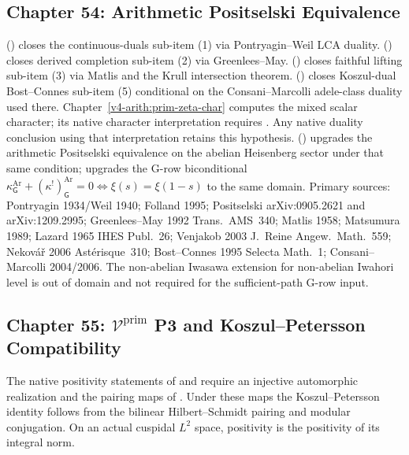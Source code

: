 \subsection{Chapter 54: Arithmetic Positselski Equivalence}
\label{v4-arith:w5-synth:ch54}

 (\ClaimStatusProvedHere)
closes the continuous-duals sub-item (1) via Pontryagin--Weil LCA
duality.
 (\ClaimStatusProvedHere)
closes derived completion sub-item (2) via Greenlees--May.
 (\ClaimStatusProvedHere)
closes faithful lifting sub-item (3) via Matlis and the Krull
intersection theorem.
(\ClaimStatusProvedHereConditional) closes Koszul-dual
Bost--Connes sub-item (5) conditional on the Consani--Marcolli
adele-class duality used there.
Chapter~\ref{v4-arith:prim-zeta-char} computes the mixed scalar
character; its native character interpretation requires
. Any native
duality conclusion using that interpretation retains this hypothesis.
(\ClaimStatusProvedHereConditional) upgrades the arithmetic
Positselski equivalence on the abelian Heisenberg sector under that
same condition;
 upgrades the
G-row biconditional
\(\kappa^{\mathrm{Ar}}_{\mathsf{G}}+(\kappa^{!})^{\mathrm{Ar}}_{\mathsf{G}}=0
\Leftrightarrow\xi(s)=\xi(1-s)\)
to the same domain.
Primary sources: Pontryagin 1934/Weil 1940; Folland 1995;
Positselski arXiv:0905.2621 and arXiv:1209.2995;
Greenlees--May 1992 Trans.~AMS~340; Matlis 1958; Matsumura 1989;
Lazard 1965 IHES Publ.~26; Venjakob 2003 J.~Reine Angew.~Math.~559;
Nekov\'a\v{r} 2006 Ast\'erisque~310; Bost--Connes 1995
Selecta Math.~1; Consani--Marcolli 2004/2006.
The non-abelian Iwasawa extension for non-abelian Iwahori level is
out of domain and not required for the sufficient-path G-row input.

\subsection{Chapter 55: \(\mathcal{V}^{\mathrm{prim}}\) P3 and Koszul--Petersson Compatibility}
\label{v4-arith:w5-synth:ch55}

The native positivity statements of
 and 
require an injective automorphic realization and the pairing maps of
. Under these maps the
Koszul--Petersson identity follows from the bilinear Hilbert--Schmidt
pairing and modular conjugation. On an actual cuspidal \(L^2\) space,
positivity is the positivity of its integral norm.

